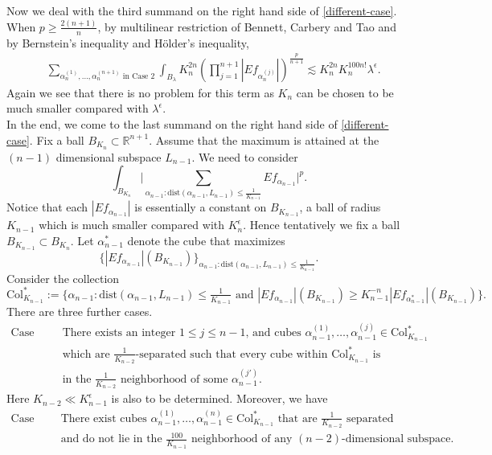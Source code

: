 \documentclass[12pt,leqno]{amsart}
\def\R{\mathbb{R}}
\def\lesim{\lesssim}
\theoremstyle{plain}
\numberwithin{equation}{section}
\begin{document}
Now we deal with the third summand on the right hand side of \eqref{different-case}. When $p\ge  \frac{2(n+1)}{n}$, by multilinear restriction of Bennett, Carbery and Tao \cite{BCT06} and by Bernstein's inequality and H\"older's inequality, 
\[
\begin{split}
& \sum_{\alpha_n^{(1)}, \dots, \alpha_n^{(n+1)} \text{ in Case 2} }\int_{B_{\lambda}} K_n^{2n} \left( \prod_{j=1}^{n+1} |Ef_{\alpha_n^{(j)}}|\right)^{\frac{p}{n+1}} \lesim K_{n}^{2n} K_n^{100 n!} \lambda^{\epsilon}.
\end{split}
\]
Again we see that there is no problem for this term as $K_n$ can be chosen to be much smaller compared with $\lambda^{\epsilon}$. \\


In the end, we come to the last summand on the right hand side of \eqref{different-case}. Fix a ball $B_{K_n}\subset \R^{n+1}$. Assume that the maximum is attained at the $(n-1)$ dimensional subspace $L_{n-1}$. We need to consider
\[
\int_{B_{K_n}}\Big|\sum_{\alpha_{n-1}: \text{dist}(\alpha_{n-1}, L_{n-1})\le \frac{1}{K_{n-1}}}Ef_{\alpha_{n-1}}\Big|^p.
\]
Notice that each $|Ef_{\alpha_{n-1}}|$ is essentially a constant on $B_{K_{n-1}}$, a ball of radius $K_{n-1}$ which is much smaller compared with $K_n^{\epsilon}$. Hence tentatively we fix a ball $B_{K_{n-1}}\subset B_{K_n}$. Let $\alpha_{n-1}^*$ denote the cube that maximizes 
\[
\{|E f_{\alpha_{n-1}}|(B_{K_{n-1}})\}_{\alpha_{n-1}: \text{dist}(\alpha_{n-1}, L_{n-1})\le \frac{1}{K_{n-1}}}.
\] 
Consider the collection 
\[
\mathrm{Col}^*_{K_{n-1}}:=\{\alpha_{n-1}: \text{dist}(\alpha_{n-1}, L_{n-1})\le \tfrac{1}{K_{n-1}} \text{ and } |Ef_{\alpha_{n-1}}|(B_{K_{n-1}})\ge K_{n-1}^{-n} |Ef_{\alpha^*_{n-1}}|(B_{K_{n-1}})\}.
\]
\noindent There are three further cases. 
\[
\begin{split}
\text{Case 3.1: } & \text{There exists an integer $1\le j\le n-1$, and cubes $\alpha_{n-1}^{(1)}, \dots, \alpha_{n-1}^{(j)}\in \mathrm{Col}^*_{K_{n-1}}$ }\\
& \text{which are $\tfrac{1}{K_{n-2}}$-separated such that every cube within $\mathrm{Col}^*_{K_{n-1}}$ is }\\
& \text{in the $\tfrac{1}{K_{n-2}}$ neighborhood of some $\alpha^{(j')}_{n-1}$.}
\end{split}
\]
Here $K_{n-2}\ll K^{\epsilon}_{n-1}$  is also to be determined. Moreover, we have 
\[
\begin{split}
\text{Case 3.2: } & \text{There exist cubes $\alpha_{n-1}^{(1)}, \dots, \alpha_{n-1}^{(n)}\in \mathrm{Col}^*_{K_{n-1}}$ that are $\tfrac{1}{K_{n-2}}$ separated}\\
& \text{and do not lie in the $\tfrac{100}{K_{n-1}}$ neighborhood of any $(n-2)$-dimensional subspace.}
\end{split}
\]
\end{document}
